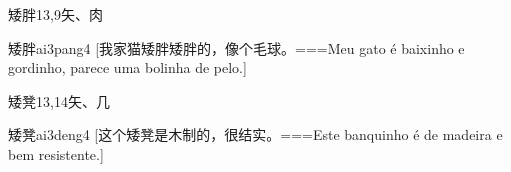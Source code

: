 \begin{Entry}{矮胖}{13,9}{⽮、⾁}
  \begin{Phonetics}{矮胖}{ai3pang4}
    [我家猫矮胖矮胖的，像个毛球。===Meu gato é baixinho e gordinho, parece uma bolinha de pelo.]
  \end{Phonetics}
\end{Entry}

\begin{Entry}{矮凳}{13,14}{⽮、⼏}
  \begin{Phonetics}{矮凳}{ai3deng4}
    [这个矮凳是木制的，很结实。===Este banquinho é de madeira e bem resistente.]
  \end{Phonetics}
\end{Entry}


